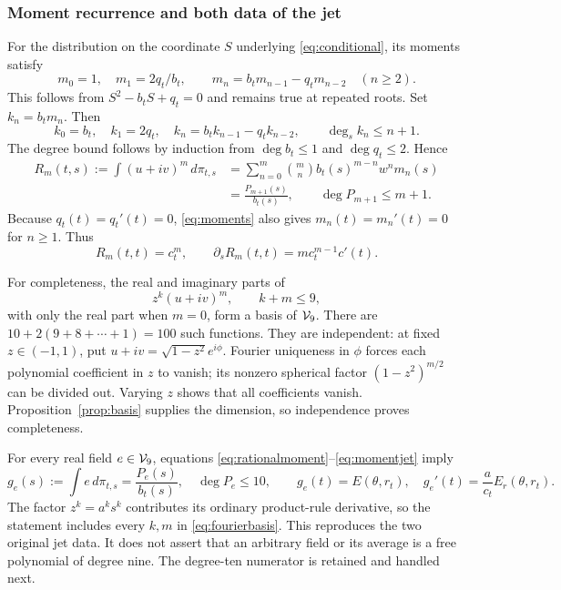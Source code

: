 \documentclass[11pt,a4paper]{article}
\begin{document}
\subsubsection{Moment recurrence and both data of the jet}
For the distribution on the coordinate $S$ underlying
\eqref{eq:conditional}, its moments satisfy
\begin{equation}\label{eq:moments}
 m_0=1,\quad m_1=2q_t/b_t,\qquad
 m_n=b_tm_{n-1}-q_tm_{n-2}\quad(n\ge2).
\end{equation}
This follows from $S^2-b_tS+q_t=0$ and remains true at repeated roots.
Set $k_n=b_tm_n$. Then
\[
 k_0=b_t,\quad k_1=2q_t,\quad
 k_n=b_tk_{n-1}-q_tk_{n-2},\qquad \deg_s k_n\le n+1.
\]
The degree bound follows by induction from $\deg b_t\le1$ and
$\deg q_t\le2$. Hence
\begin{equation}\label{eq:rationalmoment}
\begin{aligned}
 R_m(t,s):=\int(u+iv)^m\,d\pi_{t,s}
 &=\sum_{n=0}^{m}\binom mn b_t(s)^{m-n}w^n m_n(s)\\
 &=\frac{P_{m+1}(s)}{b_t(s)},\qquad \deg P_{m+1}\le m+1.
\end{aligned}
\end{equation}
Because $q_t(t)=q_t'(t)=0$, \eqref{eq:moments} also gives
$m_n(t)=m_n'(t)=0$ for $n\ge1$. Thus
\begin{equation}\label{eq:momentjet}
 R_m(t,t)=c_t^m,\qquad
 \partial_sR_m(t,t)=m c_t^{m-1}c'(t).
\end{equation}

For completeness, the real and imaginary parts of
\begin{equation}\label{eq:fourierbasis}
 z^k(u+iv)^m,\qquad k+m\le9,
\end{equation}
with only the real part when $m=0$, form a basis of $\mathcal V_9$.
There are $10+2(9+8+\cdots+1)=100$ such functions. They are
independent: at fixed $z\in(-1,1)$, put
$u+iv=\sqrt{1-z^2}e^{i\phi}$. Fourier uniqueness in $\phi$ forces
each polynomial coefficient in $z$ to vanish; its nonzero spherical
factor $(1-z^2)^{m/2}$ can be divided out. Varying $z$ shows that
all coefficients vanish. Proposition~\ref{prop:basis} supplies the
dimension, so independence proves completeness.

For every real field $e\in\mathcal V_9$, equations
\eqref{eq:rationalmoment}--\eqref{eq:momentjet} imply
\begin{equation}\label{eq:fulljet}
 g_e(s):=\int e\,d\pi_{t,s}=\frac{P_e(s)}{b_t(s)},\quad
 \deg P_e\le10,\qquad
 g_e(t)=E(\theta,r_t),\quad
 g_e'(t)=\frac{a}{c_t}E_r(\theta,r_t).
\end{equation}
The factor $z^k=a^ks^k$ contributes its ordinary product-rule
derivative, so the statement includes every $k,m$ in
\eqref{eq:fourierbasis}. This reproduces the two original jet data.
It does not assert that an arbitrary field or its average is a free
polynomial of degree nine. The degree-ten numerator is retained and
handled next.
\end{document}
